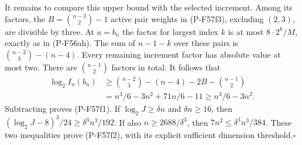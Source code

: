 It remains to compare this upper bound with the selected
increment. Among its factors, the
$B=\binom{n-3}{2}-1$ active pair weights in (P-F57f3),
excluding $(2,3)$, are divisible by three.
At $a=b_n$ the factor for largest index $k$ is at most
$8\cdot2^k/M$, exactly as in (P-F56ah).
The sum of $n-1-k$ over these pairs is
$\binom{n-2}{3}-(n-4)$.
Every remaining increment factor has absolute value at
most two. There are $\binom{n-1}{2}$ factors in total.
It follows that
\[
 \begin{split}
 \log_2 I_n(b_n)
 &\ge\binom{n-2}{3}-(n-4)-2B-\binom{n-1}{2}\\
 &=n^3/6-3n^2+71n/6-11
 \ge n^3/6-3n^2.
 \end{split}
 \tag{P-F57f9}
\]
Subtracting proves (P-F57f1).
If $\log_2J\ge\delta n$ and $\delta n\ge16$,
then $(\log_2J-8)^3/24\ge\delta^3n^3/192$.
If also $n\ge2688/\delta^3$, then
$7n^2\le\delta^3n^3/384$.
These two inequalities prove (P-F57f2), with its explicit
sufficient dimension threshold.\hfill$\square$
